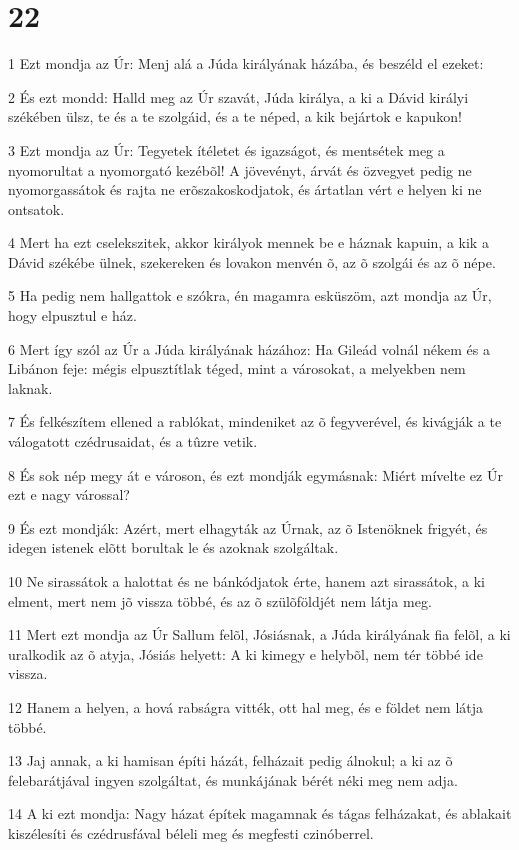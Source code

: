 \chapter{22}

\par 1 Ezt mondja az Úr: Menj alá a Júda királyának házába, és beszéld el ezeket:
\par 2 És ezt mondd: Halld meg az Úr szavát, Júda királya, a ki a Dávid királyi székében ülsz, te és a te szolgáid, és a te néped, a kik bejártok e kapukon!
\par 3 Ezt mondja az Úr: Tegyetek ítéletet és igazságot, és mentsétek meg a nyomorultat a nyomorgató kezébõl! A jövevényt, árvát és özvegyet pedig ne nyomorgassátok és rajta ne erõszakoskodjatok, és ártatlan vért e helyen ki ne ontsatok.
\par 4 Mert ha ezt cselekszitek, akkor királyok mennek be e háznak kapuin, a kik a Dávid székébe ülnek, szekereken és lovakon menvén õ, az õ szolgái és az õ népe.
\par 5 Ha pedig nem hallgattok e szókra, én magamra esküszöm, azt mondja az Úr, hogy elpusztul e ház.
\par 6 Mert így szól az Úr a Júda királyának házához: Ha Gileád volnál nékem és a Libánon feje: mégis elpusztítlak téged, mint a városokat, a melyekben nem laknak.
\par 7 És felkészítem ellened a rablókat, mindeniket az õ fegyverével, és kivágják a te válogatott czédrusaidat, és a tûzre vetik.
\par 8 És sok nép megy át e városon, és ezt mondják egymásnak: Miért mívelte ez Úr ezt e nagy várossal?
\par 9 És ezt mondják: Azért, mert elhagyták az Úrnak, az õ Istenöknek frigyét, és idegen istenek elõtt borultak le és azoknak szolgáltak.
\par 10 Ne sirassátok a halottat és ne bánkódjatok érte, hanem azt sirassátok, a ki elment, mert nem jõ vissza többé, és az õ szülõföldjét nem látja meg.
\par 11 Mert ezt mondja az Úr Sallum felõl, Jósiásnak, a Júda királyának fia felõl, a ki uralkodik az õ atyja, Jósiás helyett: A ki kimegy e helybõl, nem tér többé ide vissza.
\par 12 Hanem a helyen, a hová rabságra vitték, ott hal meg, és e földet nem látja többé.
\par 13 Jaj annak, a ki hamisan építi házát, felházait pedig álnokul; a ki az õ felebarátjával ingyen szolgáltat, és munkájának bérét néki meg nem adja.
\par 14 A ki ezt mondja: Nagy házat építek magamnak és tágas felházakat, és ablakait kiszélesíti és czédrusfával béleli meg és megfesti czinóberrel.
